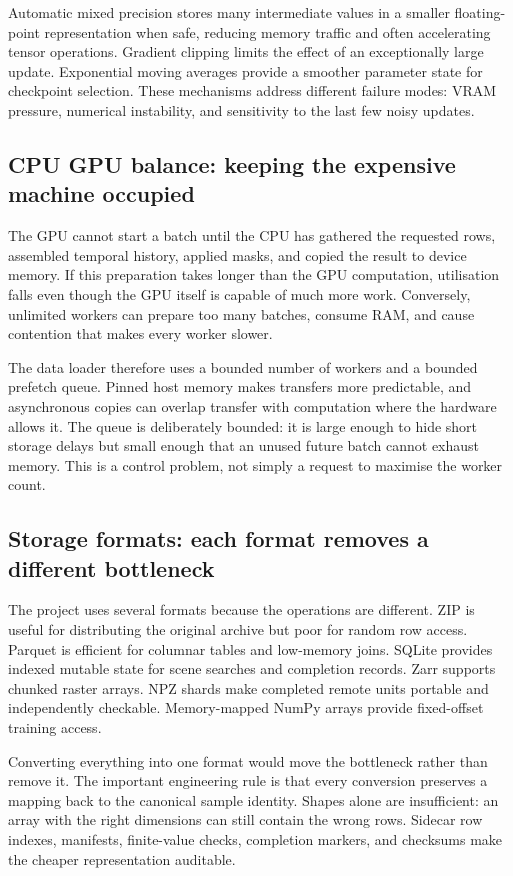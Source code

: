\documentclass[12pt,a4paper]{report}
\begin{document}
Automatic mixed precision stores many intermediate values in a smaller
floating-point representation when safe, reducing memory traffic and often
accelerating tensor operations. Gradient clipping limits the effect of an
exceptionally large update. Exponential moving averages provide a smoother
parameter state for checkpoint selection. These mechanisms address different
failure modes: VRAM pressure, numerical instability, and sensitivity to the
last few noisy updates.

\subsection{CPU GPU balance: keeping the expensive machine occupied}
The GPU cannot start a batch until the CPU has gathered the requested rows,
assembled temporal history, applied masks, and copied the result to device
memory. If this preparation takes longer than the GPU computation, utilisation
falls even though the GPU itself is capable of much more work. Conversely,
unlimited workers can prepare too many batches, consume RAM, and cause
contention that makes every worker slower.

The data loader therefore uses a bounded number of workers and a bounded
prefetch queue. Pinned host memory makes transfers more predictable, and
asynchronous copies can overlap transfer with computation where the hardware
allows it. The queue is deliberately bounded: it is large enough to hide short
storage delays but small enough that an unused future batch cannot exhaust
memory. This is a control problem, not simply a request to maximise the worker
count.

\subsection{Storage formats: each format removes a different bottleneck}
The project uses several formats because the operations are different. ZIP is
useful for distributing the original archive but poor for random row access.
Parquet is efficient for columnar tables and low-memory joins. SQLite provides
indexed mutable state for scene searches and completion records. Zarr supports
chunked raster arrays. NPZ shards make completed remote units portable and
independently checkable. Memory-mapped NumPy arrays provide fixed-offset
training access.

Converting everything into one format would move the bottleneck rather than
remove it. The important engineering rule is that every conversion preserves a
mapping back to the canonical sample identity. Shapes alone are insufficient:
an array with the right dimensions can still contain the wrong rows. Sidecar
row indexes, manifests, finite-value checks, completion markers, and checksums
make the cheaper representation auditable.
\end{document}
